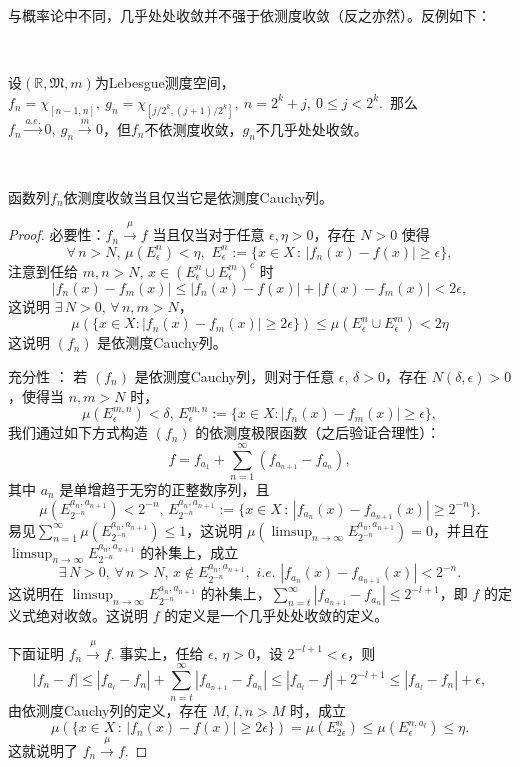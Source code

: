 \documentclass[color=green,thmcnt=section,lang=cn,12pt]{elegantbook}
\numberwithin{equation}{section}%
\numberwithin{figure}{section}%
\newcommand{\RR}{\mathbb{R}}
\begin{document}
\begin{note}
    与概率论中不同，几乎处处收敛并不强于依测度收敛（反之亦然）。反例如下：
\end{note}
\ 


\begin{example}
    设$(\RR,\mathfrak{M},m)$为Lebesgue测度空间，$f_n=\chi_{[n-1,n]},\ g_n=\chi_{[j/2^k,(j+1)/2^k]},\ n=2^k+j,\ 0\leq j <2^k$.\ 
    那么$f_n\xrightarrow{a.e.} 0,\ g_n\xrightarrow{m}0$，但$f_n$不依测度收敛，$g_n$不几乎处处收敛。
\end{example}
\ 

\begin{proposition}
    函数列$f_n$依测度收敛当且仅当它是依测度Cauchy列。
\end{proposition}
\begin{proof}
必要性：$f_n\xrightarrow{\mu} f$ 当且仅当对于任意 \(\epsilon,\eta > 0\)，存在 $N>0$ 使得 $$
\forall \,n>N,\,\mu(E_\epsilon^n)<\eta,\,\,E_\epsilon^n:=\{x\in X\,:\,|f_n(x)-f(x)|\geq \epsilon  \},
$$ 注意到任给 $m,n>N,\,x\in (E_\epsilon^n\cup E_\epsilon^m)^c$ 时 $$|f_n(x)-f_m(x)|\leq |f_n(x)-f(x)|+|f(x)-f_m(x)|<2 \epsilon ,$$ 这说明 $\exists\,N>0,\,\forall\,n,m >N$，\[
\mu(\{x \in X :|f_n(x) - f_m(x)| \geq 2\epsilon\}) \leq \mu(E_\epsilon^n\cup E_\epsilon^m)<2\eta
\]  这说明 $(f_n)$ 是依测度Cauchy列。


充分性  ：
若 \((f_n)\) 是依测度Cauchy列，则对于任意 \(\epsilon,\,\delta > 0\)，存在 \(N(\delta,\epsilon)>0\)，使得当 \(n, m > N\) 时，   \[
\mu(E_{\epsilon}^{m,n}) < \delta,\,E_\epsilon^{m,n}:=\{x \in X : |f_n(x) - f_m(x)| \geq \epsilon\},
\] 我们通过如下方式构造 $(f_n)$ 的依测度极限函数（之后验证合理性）：$$
f=f_{a_1}+\sum_{n=1}^{\infty} (f_{a_{n+1}}-f_{a_{n}} ),
$$ 其中 $a_n$ 是单增趋于无穷的正整数序列，且 $$\mu(E_{2^{-n}}^{a_n,a_{n+1}})<2^{-n},\,E_{2^{-n}}^{a_n,a_{n+1}}:=\{x\in X\,:\, |f_{a_n}(x)-f_{a_{n+1}}(x)|\geq 2^{-n} \}.$$ 易见$\sum_{n=1}^{\infty}\mu( E_{2^{-n}}^{a_n,a_{n+1}}  )\leq 1$，这说明 $\mu(\limsup_{n  \to \infty} E_{2^{-n}}^{a_n,a_{n+1}})=0 $，并且在 $\limsup_{n  \to \infty} E_{2^{-n}}^{a_n,a_{n+1}}$ 的补集上，成立 $$
\exists\, N>0,\,\forall\,n>N,\,x\notin  E_{2^{-n}}^{a_n,a_{n+1}},\,\,i.e.\,\,|f_{a_n}(x)-f_{a_{n+1}}(x)|< 2^{-n}.
$$ 这说明在 $\limsup_{n  \to \infty} E_{2^{-n}}^{a_n,a_{n+1}}$ 的补集上，$\sum_{n=t}^{\infty}|f_{a_{n+1}}-f_{a_n}|\leq 2^{-l+1} $，即 $f$ 的定义式绝对收敛。这说明 $f$ 的定义是一个几乎处处收敛的定义。

下面证明 $f_n \xrightarrow{\mu} f$. 事实上，任给 $\epsilon,\,\eta>0$，设 $2^{-l+1}<\epsilon$，则 $$
|f_n-f|\leq |f_{a_{l}}-f_n|+\sum_{n=t}^{\infty}|f_{a_{n+1}}-f_{a_n}|\leq |f_{a_{l}}-f|+ 2^{-l+1} \leq |f_{a_{l}}-f_n|+\epsilon,
$$ 由依测度Cauchy列的定义，存在 $M,\,l,n>M$ 时，成立 $$
\mu(\{x\in X\,:\, |f_n(x)-f(x)|\geq 2\epsilon\})=\mu(E_{2\epsilon}^n)\leq \mu(E_{\epsilon}^{n,a_l})\leq \eta.
$$ 这就说明了 $f_n \xrightarrow{\mu} f$. 
\end{proof}
\,
\end{document}
